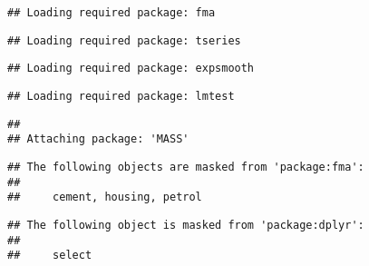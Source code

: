 \begin{frame}[fragile]
\begin{verbatim}
## Loading required package: fma
\end{verbatim}

\begin{verbatim}
## Loading required package: tseries
\end{verbatim}

\begin{verbatim}
## Loading required package: expsmooth
\end{verbatim}

\begin{verbatim}
## Loading required package: lmtest
\end{verbatim}

\begin{Shaded}
\begin{Highlighting}[]
\NormalTok{(}\NormalTok{)}
\end{Highlighting}
\end{Shaded}

\begin{verbatim}
## 
## Attaching package: 'MASS'
\end{verbatim}

\begin{verbatim}
## The following objects are masked from 'package:fma':
## 
##     cement, housing, petrol
\end{verbatim}

\begin{verbatim}
## The following object is masked from 'package:dplyr':
## 
##     select
\end{verbatim}

\begin{Shaded}
\begin{Highlighting}[]
\NormalTok{(}\NormalTok{)}
\NormalTok{(}\NormalTok{)}
\end{Highlighting}
\end{Shaded}

\begin{Shaded}
\begin{Highlighting}[]
\NormalTok{(}\NormalTok{)}

\NormalTok{data[ data ==} \NormalTok{] =}\StringTok{ }
\NormalTok{data=data[}\NormalTok{(data),]}



\end{Highlighting}
\end{Shaded}
\end{frame}
